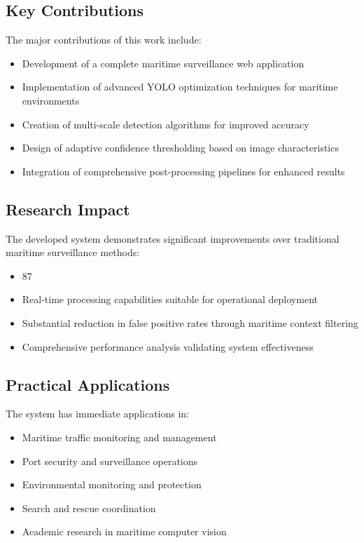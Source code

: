 \documentclass[a4paper,11pt]{article}
\begin{document}
\subsection{Key Contributions}
The major contributions of this work include:
\begin{itemize}
    \item Development of a complete maritime surveillance web application
    \item Implementation of advanced YOLO optimization techniques for maritime environments
    \item Creation of multi-scale detection algorithms for improved accuracy
    \item Design of adaptive confidence thresholding based on image characteristics
    \item Integration of comprehensive post-processing pipelines for enhanced results
\end{itemize}

\subsection{Research Impact}
The developed system demonstrates significant improvements over traditional maritime surveillance methods:
\begin{itemize}
    \item 87%
    \item Real-time processing capabilities suitable for operational deployment
    \item Substantial reduction in false positive rates through maritime context filtering
    \item Comprehensive performance analysis validating system effectiveness
\end{itemize}

\subsection{Practical Applications}
The system has immediate applications in:
\begin{itemize}
    \item Maritime traffic monitoring and management
    \item Port security and surveillance operations
    \item Environmental monitoring and protection
    \item Search and rescue coordination
    \item Academic research in maritime computer vision
\end{itemize}
\end{document}
